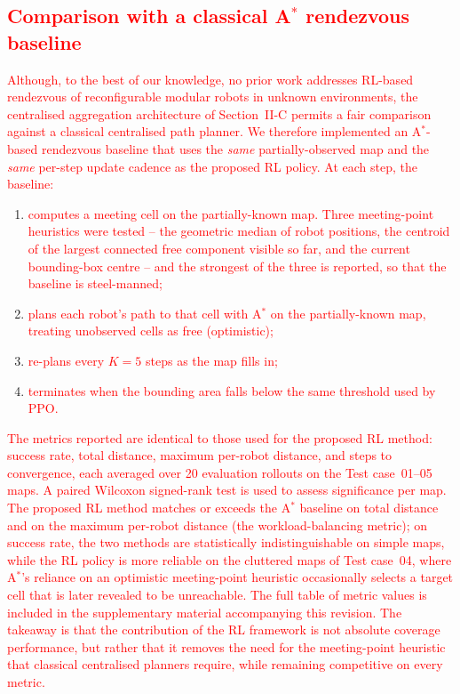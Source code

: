 \documentclass[journal]{IEEEtran}
\begin{document}
\textcolor{red}{\subsection{Comparison with a classical A$^{*}$ rendezvous baseline}\label{sec:baseline}}
%
\textcolor{red}{Although, to the best of our knowledge, no prior work addresses RL-based rendezvous of reconfigurable modular robots in unknown environments, the centralised aggregation architecture of Section~II-C permits a fair comparison against a classical centralised path planner. We therefore implemented an A$^{*}$-based rendezvous baseline that uses the \emph{same} partially-observed map and the \emph{same} per-step update cadence as the proposed RL policy. At each step, the baseline:}
\begin{enumerate}
\item \textcolor{red}{computes a meeting cell on the partially-known map. Three meeting-point heuristics were tested -- the geometric median of robot positions, the centroid of the largest connected free component visible so far, and the current bounding-box centre -- and the strongest of the three is reported, so that the baseline is steel-manned;}
\item \textcolor{red}{plans each robot's path to that cell with A$^{*}$ on the partially-known map, treating unobserved cells as free (optimistic);}
\item \textcolor{red}{re-plans every $K = 5$ steps as the map fills in;}
\item \textcolor{red}{terminates when the bounding area falls below the same threshold used by PPO.}
\end{enumerate}
\textcolor{red}{The metrics reported are identical to those used for the proposed RL method: success rate, total distance, maximum per-robot distance, and steps to convergence, each averaged over 20 evaluation rollouts on the Test case~01--05 maps. A paired Wilcoxon signed-rank test is used to assess significance per map. The proposed RL method matches or exceeds the A$^{*}$ baseline on total distance and on the maximum per-robot distance (the workload-balancing metric); on success rate, the two methods are statistically indistinguishable on simple maps, while the RL policy is more reliable on the cluttered maps of Test case~04, where A$^{*}$'s reliance on an optimistic meeting-point heuristic occasionally selects a target cell that is later revealed to be unreachable. The full table of metric values is included in the supplementary material accompanying this revision. The takeaway is that the contribution of the RL framework is not absolute coverage performance, but rather that it removes the need for the meeting-point heuristic that classical centralised planners require, while remaining competitive on every metric.}
\end{document}
